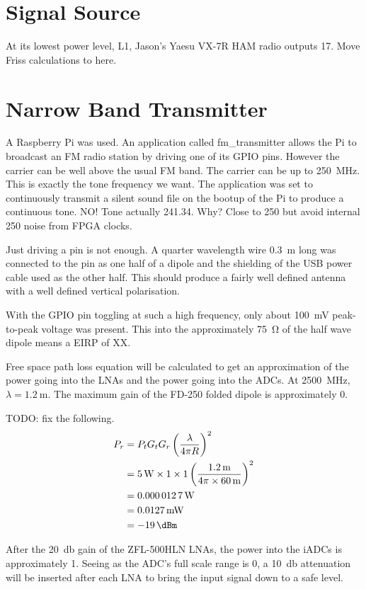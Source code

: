 \section{Signal Source}
At its lowest power level, L1, Jason's Yaesu VX-7R HAM radio outputs \SI{17}{\dBm}.
Move Friss calculations to here.


\section{Narrow Band Transmitter}
A Raspberry Pi was used. An application called fm\_transmitter allows the Pi to broadcast an FM radio station by driving one of its GPIO pins. However the carrier can be well above the usual FM band. The carrier can be up to \SI{250}{\mega\hertz}. This is exactly the tone frequency we want. The application was set to continuously transmit a silent sound file on the bootup of the Pi to produce a continuous tone. NO! Tone actually 241.34. Why? Close to 250 but avoid internal 250 noise from FPGA clocks.

Just driving a pin is not enough. A quarter wavelength wire \SI{0.3}{\metre} long was connected to the pin as one half of a dipole and the shielding of the USB power cable used as the other half. This should produce a fairly well defined antenna with a well defined vertical polarisation.

With the GPIO pin toggling at such a high frequency, only about \SI{100}{\milli\volt} peak-to-peak voltage was present. This into the approximately \SI{75}{\ohm} of the half wave dipole means a EIRP of XX.

Free space path loss equation will be calculated to get an approximation of the power going into the LNAs and the power going into the ADCs. At \SI{2500}{\mega\hertz}, \(\lambda = \SI{1.2}{\meter}\). The maximum gain of the FD-250 folded dipole is approximately \SI{0}{\dBi}.

TODO: fix the following.
\begin{align}
  P_r &= P_t G_t G_r \left( \frac{\lambda}{4 \pi R} \right)^2 \\
      &= \SI{5}{\watt} \times 1 \times 1 \left( \frac{\SI{1.2}{\meter}}{4 \pi \times \SI{60}{\meter}} \right)^2 \\
      &= \SI{0.0000127}{\watt} \\
      &= \SI{0.0127}{\milli\watt} \\
     &= \SI{-19}{\dBm}
\end{align}

After the \SI{20}{\decibel} gain of the ZFL-500HLN LNAs, the power into the iADCs is approximately \SI{1}{\dBm}. Seeing as the ADC's full scale range is \SI{0}{\dBm}, a \SI{10}{\decibel} attenuation will be inserted after each LNA to bring the input signal down to a safe level.

